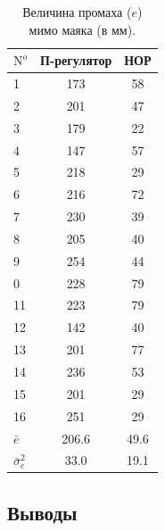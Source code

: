 \begin{table}
\caption{Величина промаха ($e$) мимо маяка (в мм).}\label{tabl:moby_pc_noc_cmp}
\begin{tabular}{|l|c|c|}
\hline
$\mathrm{N}^o$ & П-регулятор & НОР \\
\hline
1&	173&	58\\
2&	201&	47\\
3&	179&	22\\
4&	147&	57\\
5&	218&	29\\
6&	216&	72\\
7&	230&	39\\
8&	205&	40\\
9&	254&	44\\
0&	228&	79\\
11&	223&	79\\
12&	142&	40\\
13&	201&	77\\
14&	236&	53\\
15&	201&	29\\
16&	251&	29\\
\hline
$\bar e$       & 206.6&	49.6\\
$\bar\sigma^2_e$& 33.0 &	19.1\\
\hline
\end{tabular}
\end{table}

\subsection{Выводы}

